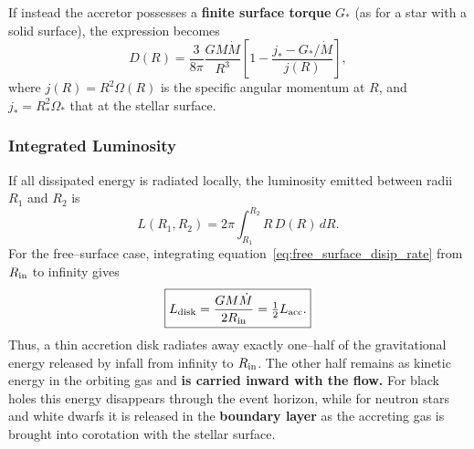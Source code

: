 \vspace{0.3cm}
\noindent
If instead the accretor possesses a \textbf{finite surface torque} $G_*$ (as for a star with a solid surface), 
the expression becomes
\begin{equation}
    D(R) = \frac{3}{8\pi}\frac{GM\dot{M}}{R^3}
    \left[1 - \frac{j_* - G_*/\dot{M}}{j(R)}\right],
\end{equation}
where $j(R)=R^2\Omega(R)$ is the specific angular momentum at $R$, and 
$j_*=R_*^2\Omega_*$ that at the stellar surface.
\vspace{0.4cm}
\subsubsection*{Integrated Luminosity}
If all dissipated energy is radiated locally, the luminosity emitted between radii $R_1$ and $R_2$ is
\begin{equation}
    L(R_1,R_2) = 2\pi \int_{R_1}^{R_2} R\,D(R)\,dR.
\end{equation}
For the free--surface case, integrating equation~\eqref{eq:free_surface_disip_rate} from 
$R_{\rm in}$ to infinity gives
\begin{equation}
    \label{L_disk}
    \boxed{
    L_{\rm disk} = \frac{GM\dot{M}}{2R_{\rm in}} = \tfrac{1}{2}L_{\rm acc}.
    }
\end{equation}
Thus, a thin accretion disk radiates away exactly one--half of the gravitational energy 
released by infall from infinity to $R_{\rm in}$.  
The other half remains as kinetic energy in the orbiting gas and \textbf{is carried inward with the flow.  }
For black holes this energy disappears through the event horizon, while for neutron stars 
and white dwarfs it is released in the \textbf{boundary layer} as the accreting gas is brought into 
corotation with the stellar surface.

\vspace{0.4cm}
